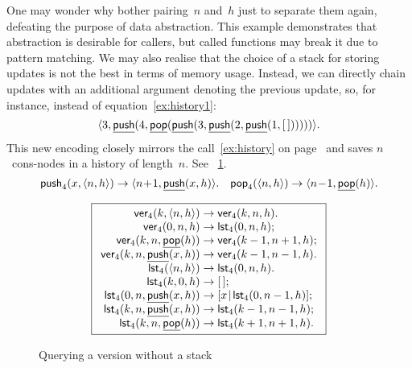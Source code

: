 One may wonder why bother pairing~\(n\) and~\(h\) just to separate
them again, defeating the purpose of data abstraction. This example
demonstrates that abstraction is desirable for callers, but called
functions may break it due to pattern matching. We may also realise
that the choice of a stack for storing updates is not the best in
terms of memory usage. Instead, we can directly chain updates with an
additional argument denoting the previous update, so, for instance,
instead of equation~\eqref{ex:history1}:
\begin{equation*}
\langle{3},{\underline{\textsf{push}}(4, \underline{\textsf{pop}}(\underline{\textsf{push}}(3, \underline{\textsf{push}}(2, \underline{\textsf{push}}(1,[\,])))))}\rangle.
\end{equation*}
This new encoding closely mirrors
the call~\eqref{ex:history} on page~\pageref{ex:history} and saves
\(n\)~cons\hyp{}nodes in a history of length~\(n\). See
\fig~\ref{fig:ver}.
\begin{equation*}
\textsf{push}_4(x,\langle{n},{h}\rangle) \rightarrow
\langle{n\!+\!1},{\underline{\textsf{push}}(x,h)}\rangle.\quad
\textsf{pop}_4(\langle{n},{h}\rangle) \rightarrow \langle{n\!-\!1},{\underline{\textsf{pop}}(h)}\rangle.
\end{equation*}
\begin{figure}[t]
\begin{equation*}
\boxed{%
\begin{array}{r@{\;}l@{\;}l}
\fun{ver}_4(k,\pair{n}{h}) & \rightarrow & \fun{ver}_4(k,n,h).\\
\fun{ver}_4(0,n,h) & \rightarrow & \fun{lst}_4(0,n,h);\\
\fun{ver}_4(k,n,\ufun{pop}(h))
                      & \rightarrow & \fun{ver}_4(k-1,n+1,h);\\
\fun{ver}_4(k,n,\ufun{push}(x,h))
                      & \rightarrow & \fun{ver}_4(k-1,n-1,h).\\
\fun{lst}_4(\pair{n}{h}) & \rightarrow & \fun{lst}_4(0,n,h).\\
\fun{lst}_4(k,0,h) & \rightarrow & \el;\\
\fun{lst}_4(0,n,\ufun{push}(x,h)) & \rightarrow
                      & \cons{x}{\fun{lst}_4(0,n-1,h)};\\
\fun{lst}_4(k,n,\ufun{push}(x,h)) & \rightarrow
                      & \fun{lst}_4(k-1,n-1,h);\\
\fun{lst}_4(k,n,\ufun{pop}(h)) & \rightarrow 
                      & \fun{lst}_4(k+1,n+1,h).
\end{array}}
\end{equation*}
\caption{Querying a version without a stack\label{fig:ver}}
\end{figure}

